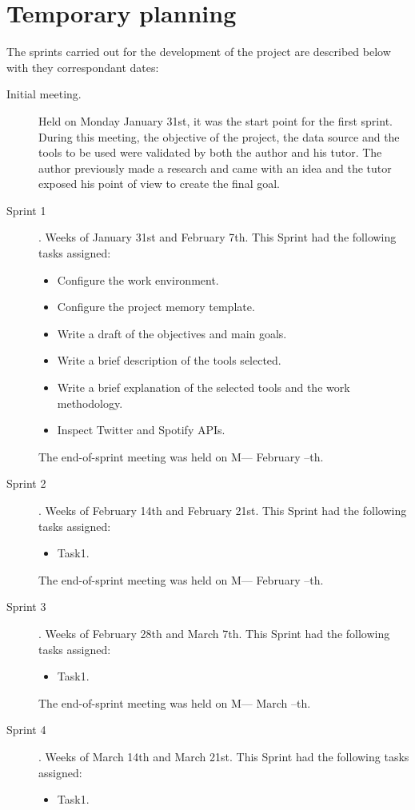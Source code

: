 \section{Temporary planning}
\nonzeroparskip The sprints carried out for the development of the project are described below with they correspondant dates:
\begin{description}
	\item[Initial meeting.] Held on Monday January 31st, it was the start point for the first sprint. During this meeting, the objective of the project, the data source and the tools to be used were validated by both the author and his tutor. The author previously made a research and came with an idea and the tutor exposed his point of view to create the final goal.
	\item[Sprint 1]. Weeks of January 31st and February 7th. This Sprint had the following tasks assigned:
	\begin{itemize}
		\item Configure the work environment.
		\item Configure the project memory template.
		\item Write a draft of the objectives and main goals.
		\item Write a brief description of the tools selected.
		\item Write a brief explanation of the selected tools and the work methodology.
		\item Inspect Twitter and Spotify APIs.
	\end{itemize}
	The end-of-sprint meeting was held on M--- February --th.
	\item[Sprint 2]. Weeks of February 14th and February 21st. This Sprint had the following tasks assigned:
	\begin{itemize}
		\item Task1.
	\end{itemize}
	The end-of-sprint meeting was held on M--- February --th.
	\item[Sprint 3]. Weeks of February 28th and March 7th. This Sprint had the following tasks assigned:
	\begin{itemize}
		\item Task1.
	\end{itemize}
	The end-of-sprint meeting was held on M--- March --th.
	\item[Sprint 4]. Weeks of March 14th and March 21st. This Sprint had the following tasks assigned:
	\begin{itemize}
		\item Task1.

\end{itemize}
\end{description}
